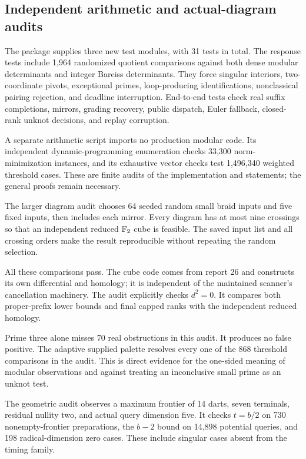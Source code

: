 \subsection{Independent arithmetic and actual-diagram audits}

The package supplies three new test modules, with 31 tests in total. The response
tests include 1,964 randomized quotient comparisons against both dense modular
determinants and integer Bareiss determinants. They force singular interiors,
two-coordinate pivots, exceptional primes, loop-producing identifications,
nonclassical pairing rejection, and deadline interruption. End-to-end tests
check real suffix completions, mirrors, grading recovery, public dispatch,
Euler fallback, closed-rank unknot decisions, and replay corruption.

A separate arithmetic script imports no production modular code. Its independent
dynamic-programming enumeration checks 33,300 norm-minimization instances, and
its exhaustive vector checks test 1,496,340 weighted threshold cases. These are
finite audits of the implementation and statements; the general proofs remain
necessary.

The larger diagram audit chooses 64 seeded random small braid inputs and five
fixed inputs, then includes each mirror. Every diagram has at most nine
crossings so that an independent reduced $\mathbb F_2$ cube is feasible. The saved
input list and all crossing orders make the result reproducible without
repeating the random selection.



All these comparisons pass. The cube code comes from report 26 and constructs
its own differential and homology; it is independent of the maintained scanner's
cancellation machinery. The audit explicitly checks $d^2=0$. It compares both
proper-prefix lower bounds and final capped ranks with the independent reduced
homology.

Prime three alone misses 70 real obstructions in this audit. It produces no
false positive. The adaptive supplied palette resolves every one of the 868
threshold comparisons in the audit. This is direct evidence for the one-sided
meaning of modular observations and against treating an inconclusive small
prime as an unknot test.

The geometric audit observes a maximum frontier of 14 darts, seven terminals,
residual nullity two, and actual query dimension five. It checks $t=b/2$ on
730 nonempty-frontier preparations, the $b-2$ bound on 14,898 potential queries,
and 198 radical-dimension zero cases. These include singular cases absent
from the timing family.

